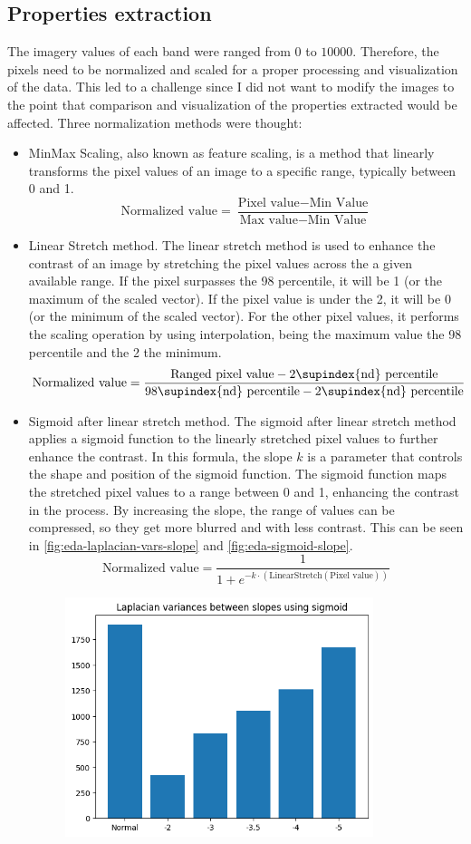 \documentclass[11pt, a4paper]{article}
\begin{document}
	\subsection{Properties extraction}
	The imagery values of each band were ranged from $0$ to $10000$. Therefore, the pixels need to be normalized and scaled for a proper processing and visualization of the data. This led to a challenge since I did not want to modify the images to the point that comparison and visualization of the properties extracted would be affected. Three normalization methods were thought:
	\begin{itemize}
		\item MinMax Scaling, also known as feature scaling, is a method that linearly transforms the pixel values of an image to a specific range, typically between 0 and 1. 
		\[\text{Normalized value} = \frac{\text{Pixel value} - \text{Min Value}}{\text{Max value} - \text{Min Value}}\]
		\item Linear Stretch method. The linear stretch method is used to enhance the contrast of an image by stretching the pixel values across the a given available range.  If the pixel surpasses the 98 percentile, it will be 1 (or the maximum of the scaled vector). If the pixel value is under the 2, it will be 0 (or the minimum of the scaled vector). For the other pixel values, it performs the scaling operation by using interpolation, being the maximum value the 98 percentile and the 2 the minimum.
		\[\text{Normalized value} = \frac{\text{Ranged pixel value} - \text{2\supindex{nd} percentile}}{\text{98\supindex{nd} percentile} - \text{2\supindex{nd} percentile}}\]
		\item Sigmoid after linear stretch method. The sigmoid after linear stretch method applies a sigmoid function to the linearly stretched pixel values to further enhance the contrast. In this formula, the slope $k$ is a parameter that controls the shape and position of the sigmoid function. The sigmoid function maps the stretched pixel values to a range between 0 and 1, enhancing the contrast in the process. By increasing the slope, the range of values can be compressed, so they get more blurred and with less contrast. This can be seen in  \ref{fig:eda-laplacian-vars-slope} and \ref{fig:eda-sigmoid-slope}.
		\[\text{Normalized value} = \frac{1}{1 + e^{-k \cdot(\text{LinearStretch}(\text{Pixel value}))}}\]
			\begin{figure}[H]
			\centering
			\includegraphics[width=9cm]{imgs/eda/sigmoid-slope-2}

\end{figure}
\end{itemize}
\end{document}
